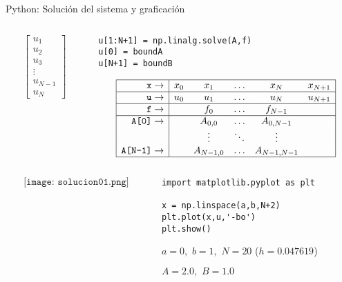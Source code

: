 \documentclass[handout]{beamer}
\begin{document}
\begin{frame}[fragile]{Python: Soluci\'on del sistema y graficaci\'on}
	
	\begin{columns}
		\begin{column}{0.3\textwidth}
			{\footnotesize \[
			\left[
			\begin{matrix}
			u_1 \\ u_2 \\ u_3 \\ \vdots \\ u_{N-1} \\ u_N
			\end{matrix}
			\right]\]}
		\end{column}
		\begin{column}{0.7\textwidth}  %
			
\begin{lstlisting}
u[1:N+1] = np.linalg.solve(A,f)
u[0] = boundA
u[N+1] = boundB 
\end{lstlisting}	
{\tiny
\[
\begin{array}{|r|ccccc|}
\hline
\texttt{x} \rightarrow & x_0 & x_1 & \dots & x_N & x_{N+1}  \\
\hline 
\texttt{u} \rightarrow & u_0 & u_1 & \dots & u_N & u_{N+1}  \\
\hline 
\texttt{f} \rightarrow &     & f_0 & \dots & f_{N-1} &     \\
\hline 
\texttt{A[0]} \rightarrow &  & A_{0,0} & \dots &  A_{0,N-1} & \\
 & & \vdots & \ddots & \vdots &  \\
\texttt{A[N-1]} \rightarrow & & A_{N-1,0} & \dots &  A_{N-1,N-1} &\\
\hline
\end{array}
\]
}		
		\end{column}
	\end{columns}
	
\pause

	\begin{columns}
		\begin{column}{0.5\textwidth}
$$\texttt{[image: solucion01.png]}$$
		\end{column}
		\begin{column}{0.5\textwidth}  %
			
\begin{lstlisting}
import matplotlib.pyplot as plt

x = np.linspace(a,b,N+2)
plt.plot(x,u,'-bo')
plt.show()
\end{lstlisting}

{\footnotesize 
$a = 0, \,\, b = 1, \,\, N = 20$ ($h = 0.047619$)

$A = 2.0, \,\, B = 1.0$}
		\end{column}
	\end{columns}
	
\end{frame}
\end{document}
